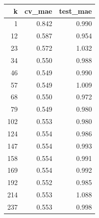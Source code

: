 \begin{tabular}{rrr}
\toprule
k & cv_mae & test_mae \\
\midrule
1 & 0.842 & 0.990 \\
12 & 0.587 & 0.954 \\
23 & 0.572 & 1.032 \\
34 & 0.550 & 0.988 \\
46 & 0.549 & 0.990 \\
57 & 0.549 & 1.009 \\
68 & 0.550 & 0.972 \\
79 & 0.549 & 0.980 \\
102 & 0.553 & 0.980 \\
124 & 0.554 & 0.986 \\
147 & 0.554 & 0.993 \\
158 & 0.554 & 0.991 \\
169 & 0.554 & 0.992 \\
192 & 0.552 & 0.985 \\
214 & 0.553 & 1.088 \\
237 & 0.553 & 0.998 \\
\bottomrule
\end{tabular}
